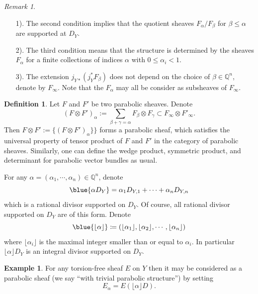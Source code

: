 \documentclass[12pt,twoside]{book}
\theoremstyle{plain}
\theoremstyle{definition}
\newtheorem{definition}[definition]{Definition}
\newtheorem{example}[example]{Example}
\theoremstyle{remark}
\newtheorem{remark}[remark]{Remark}
\newcommand{\bQ}{{\mathbb Q}}
\numberwithin{equation}{section}
\begin{document}
\begin{remark}
\begin{enumerate}
\item[1).] The second condition implies that the quotient sheaves $F_\alpha/F_\beta$ for $\beta\leq \alpha$ are supported at $D_Y$.
\item[2).] The third condition means that the structure is determined by the sheaves $F_\alpha$ for a finite collections of indices $\alpha$ with $0\leq\alpha_i<1$.
\item[3).] The extension $j_{Y*}\left( j_Y^* F_\beta\right)$ does not depend on the choice of $\beta\in\bQ^n$, denote by $F_\infty$. Note that the $F_\alpha$ may all be consider as subsheaves of $F_\infty$.
\end{enumerate}
\end{remark}

\begin{definition}
Let $F$ and $F'$ be two parabolic sheaves. Denote
\[(F\otimes F')_{\alpha}:= \sum_{\beta+\gamma = \alpha} F_\beta \otimes F_{\gamma}\subset F_\infty \otimes F'_\infty.\]
Then $F\otimes F':=\{(F\otimes F')_{\alpha}\}\}$ forms a parabolic sheaf, which satisfies the universal property of tensor product of $F$ and $F'$ in the category of parabolic sheaves. Similarly, one can define the wedge product, symmetric product, and determinant for parabolic vector bundles as usual.
\end{definition}



For any $\alpha=(\alpha_1,\cdots,\alpha_n)\in\bQ^n$, denote
\[\blue{\alpha D_Y} = \alpha_1D_{Y,1} + \cdots + \alpha_n D_{Y,n}\]
which is a rational divisor supported on $D_Y$. Of course, all rational divisor supported on $D_Y$ are of this form. Denote
\[\blue{\lfloor\alpha\rfloor} \coloneqq (\lfloor\alpha_1\rfloor,\lfloor\alpha_2\rfloor,\cdots,\lfloor\alpha_n\rfloor)\]
where $\lfloor\alpha_i\rfloor$ is the maximal integer smaller than or equal to $\alpha_i$. In particular $\lfloor\alpha\rfloor D_Y$ is an integral divisor supported on $D_Y$.

\begin{example} For any torsion-free sheaf $E$ on $Y$ then it may be considered as a parabolic sheaf (we say ``with trivial parabolic structure'') by setting
\[E_\alpha = E(\lfloor\alpha\rfloor D).\]

\end{example}
\end{document}
